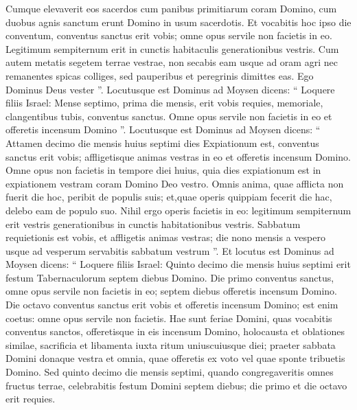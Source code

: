 \begin{biblechapter}
\begin{biblechapter}
\begin{biblechapter}
\begin{biblechapter}
\begin{biblechapter}
\begin{biblechapter}
\begin{biblechapter}
\begin{biblechapter}
\begin{biblechapter}
\begin{biblechapter}
\begin{biblechapter}
\begin{biblechapter}
\begin{biblechapter}
\begin{biblechapter}
\begin{biblechapter}
\begin{biblechapter}
\begin{biblechapter}
\begin{biblechapter}
\begin{biblechapter}
\begin{biblechapter}
\begin{biblechapter}
\begin{biblechapter}
\begin{biblechapter}
\verse Cumque elevaverit eos sacerdos cum panibus primitiarum coram Domino, cum duobus agnis sanctum erunt Domino in usum sacerdotis. 
\verse Et vocabitis hoc ipso die conventum, conventus sanctus erit vobis; omne opus servile non facietis in eo. Legitimum sempiternum erit in cunctis habitaculis generationibus vestris.
 \verse Cum autem metatis segetem terrae vestrae, non secabis eam usque ad oram agri nec remanentes spicas colliges, sed pauperibus et peregrinis dimittes eas. Ego Dominus Deus vester ”.
 \verse Locutusque est Dominus ad Moysen dicens: 
\verse “ Loquere filiis Israel: Mense septimo, prima die mensis, erit vobis requies, memoriale, clangentibus tubis, conventus sanctus. 
\verse Omne opus servile non facietis in eo et offeretis incensum Domino ”.
 \verse Locutusque est Dominus ad Moysen dicens: 
\verse “ Attamen decimo die mensis huius septimi dies Expiationum est, conventus sanctus erit vobis; affligetisque animas vestras in eo et offeretis incensum Domino. 
\verse Omne opus non facietis in tempore diei huius, quia dies expiationum est in expiationem vestram coram Domino Deo vestro. 
\verse Omnis anima, quae afflicta non fuerit die hoc, peribit de populis suis; 
\verse et,quae operis quippiam fecerit die hac, delebo eam de populo suo. 
\verse Nihil ergo operis facietis in eo: legitimum sempiternum erit vestris generationibus in cunctis habitationibus vestris. 
\verse Sabbatum requietionis est vobis, et affligetis animas vestras; die nono mensis a vespero usque ad vesperum servabitis sabbatum vestrum ”.
 \verse Et locutus est Dominus ad Moysen dicens: 
\verse “ Loquere filiis Israel: Quinto decimo die mensis huius septimi erit festum Tabernaculorum septem diebus Domino. 
\verse Die primo conventus sanctus, omne opus servile non facietis in eo; 
\verse septem diebus offeretis incensum Domino. Die octavo conventus sanctus erit vobis et offeretis incensum Domino; est enim coetus: omne opus servile non facietis.
 \verse Hae sunt feriae Domini, quas vocabitis conventus sanctos, offeretisque in eis incensum Domino, holocausta et oblationes similae, sacrificia et libamenta iuxta ritum uniuscuiusque diei; 
\verse praeter sabbata Domini donaque vestra et omnia, quae offeretis ex voto vel quae sponte tribuetis Domino.
 \verse Sed quinto decimo die mensis septimi, quando congregaveritis omnes fructus terrae, celebrabitis festum Domini septem diebus; die primo et die octavo erit requies. 

\end{biblechapter}
\end{biblechapter}
\end{biblechapter}
\end{biblechapter}
\end{biblechapter}
\end{biblechapter}
\end{biblechapter}
\end{biblechapter}
\end{biblechapter}
\end{biblechapter}
\end{biblechapter}
\end{biblechapter}
\end{biblechapter}
\end{biblechapter}
\end{biblechapter}
\end{biblechapter}
\end{biblechapter}
\end{biblechapter}
\end{biblechapter}
\end{biblechapter}
\end{biblechapter}
\end{biblechapter}
\end{biblechapter}
